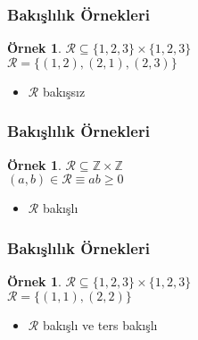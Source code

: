 \documentclass[dvipsnames]{beamer}
\theoremstyle{definition}
\theoremstyle{example}
\newtheorem{ornek}[theorem]{Örnek}
\theoremstyle{plain}
\begin{document}
%
%
%

\begin{frame}
  \frametitle{Bakışlılık Örnekleri}

  \begin{ornek}
    $\mathcal{R} \subseteq \{1,2,3\} \times \{1,2,3\}$\\
    $\mathcal{R} = \{(1,2), (2,1), (2,3)\}$

    \pause
    \medskip
    \begin{itemize}
      \item $\mathcal{R}$ bakışsız
    \end{itemize}
  \end{ornek}
\end{frame}

\begin{frame}
  \frametitle{Bakışlılık Örnekleri}

  \begin{ornek}
    $\mathcal{R} \subseteq \mathbb{Z} \times \mathbb{Z}$\\
    $(a,b) \in \mathcal{R} \equiv ab \geq 0$

    \medskip
    \begin{itemize}
      \item $\mathcal{R}$ bakışlı
    \end{itemize}
  \end{ornek}
\end{frame}

\begin{frame}
  \frametitle{Bakışlılık Örnekleri}

  \begin{ornek}
    $\mathcal{R} \subseteq \{1,2,3\} \times \{1,2,3\}$\\
    $\mathcal{R} = \{(1,1), (2,2)\}$

    \begin{itemize}
      \item $\mathcal{R}$ bakışlı ve ters bakışlı
    \end{itemize}
  \end{ornek}
\end{frame}
\end{document}

